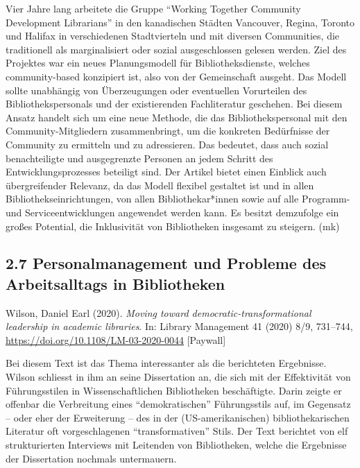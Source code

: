 \documentclass[a4paper,
fontsize=11pt,
oneside,
numbers=noperiodatend,
parskip=half-,
bibliography=totoc,
final
]{scrartcl}
\begin{document}
Vier Jahre lang arbeitete die Gruppe \enquote{Working Together Community
Development Librarians} in den kanadischen Städten Vancouver, Regina,
Toronto und Halifax in verschiedenen Stadtvierteln und mit diversen
Communities, die traditionell als marginalisiert oder sozial
ausgeschlossen gelesen werden. Ziel des Projektes war ein neues
Planungsmodell für Bibliotheksdienste, welches community-based
konzipiert ist, also von der Gemeinschaft ausgeht. Das Modell sollte
unabhängig von Überzeugungen oder eventuellen Vorurteilen des
Bibliothekspersonals und der existierenden Fachliteratur geschehen. Bei
diesem Ansatz handelt sich um eine neue Methode, die das
Bibliothekspersonal mit den Community-Mitgliedern zusammenbringt, um die
konkreten Bedürfnisse der Community zu ermitteln und zu adressieren. Das
bedeutet, dass auch sozial benachteiligte und ausgegrenzte Personen an
jedem Schritt des Entwicklungsprozesses beteiligt sind. Der Artikel
bietet einen Einblick auch übergreifender Relevanz, da das Modell
flexibel gestaltet ist und in allen Bibliothekseinrichtungen, von allen
Bibliothekar*innen sowie auf alle Programm- und Serviceentwicklungen
angewendet werden kann. Es besitzt demzufolge ein großes Potential, die
Inklusivität von Bibliotheken insgesamt zu steigern. (mk)

\hypertarget{personalmanagement-und-probleme-des-arbeitsalltags-in-bibliotheken}{%
\subsection{2.7 Personalmanagement und Probleme des Arbeitsalltags in
Bibliotheken}\label{personalmanagement-und-probleme-des-arbeitsalltags-in-bibliotheken}}

Wilson, Daniel Earl (2020). \emph{Moving toward
democratic-transformational leadership in academic libraries}. In:
Library Management 41 (2020) 8/9, 731--744,
\url{https://doi.org/10.1108/LM-03-2020-0044} {[}Paywall{]}

Bei diesem Text ist das Thema interessanter als die berichteten
Ergebnisse. Wilson schliesst in ihm an seine Dissertation an, die sich
mit der Effektivität von Führungsstilen in Wissenschaftlichen
Bibliotheken beschäftigte. Darin zeigte er offenbar die Verbreitung
eines \enquote{demokratischen} Führungsstils auf, im Gegensatz -- oder
eher der Erweiterung -- des in der (US-amerikanischen)
bibliothekarischen Literatur oft vorgeschlagenen
\enquote{transformativen} Stils. Der Text berichtet von elf
strukturierten Interviews mit Leitenden von Bibliotheken, welche die
Ergebnisse der Dissertation nochmals untermauern.
\end{document}
